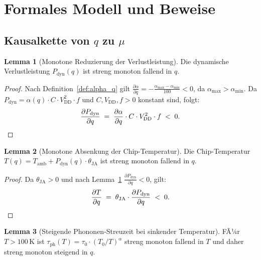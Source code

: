 ﻿\documentclass[a4paper,12pt]{article}
\theoremstyle{definition}
\newtheorem{lemma}{Lemma}
\begin{document}
\section{Formales Modell und Beweise}

\subsection{Kausalkette von $q$ zu $\mu$}

\begin{lemma}[Monotone Reduzierung der Verlustleistung]
\label{lem:verlust}
Die dynamische Verlustleistung $P_{\mathrm{dyn}}(q)$ ist streng monoton fallend in $q$.
\end{lemma}

\begin{proof}
Nach Definition~\ref{def:alpha_q} gilt
$\frac{\partial \alpha}{\partial q} = -\frac{\alpha_{\mathrm{max}} - \alpha_{\mathrm{min}}}{100} < 0$,
da $\alpha_{\mathrm{max}} > \alpha_{\mathrm{min}}$. Da $P_{\mathrm{dyn}} = \alpha(q) \cdot C \cdot V_{\mathrm{DD}}^2 \cdot f$
und $C, V_{\mathrm{DD}}, f > 0$ konstant sind, folgt:
\[
\frac{\partial P_{\mathrm{dyn}}}{\partial q} \;=\; \frac{\partial \alpha}{\partial q} \cdot C \cdot V_{\mathrm{DD}}^2 \cdot f \;<\; 0. \qedhere
\]
\end{proof}

\begin{lemma}[Monotone Absenkung der Chip-Temperatur]
\label{lem:temp}
Die Chip-Temperatur $T(q) = T_{\mathrm{amb}} + P_{\mathrm{dyn}}(q) \cdot \theta_{\mathrm{JA}}$
ist streng monoton fallend in $q$.
\end{lemma}

\begin{proof}
Da $\theta_{\mathrm{JA}} > 0$ und nach Lemma~\ref{lem:verlust}
$\frac{\partial P_{\mathrm{dyn}}}{\partial q} < 0$, gilt:
\[
\frac{\partial T}{\partial q} \;=\; \theta_{\mathrm{JA}} \cdot \frac{\partial P_{\mathrm{dyn}}}{\partial q} \;<\; 0. \qedhere
\]
\end{proof}

\begin{lemma}[Steigende Phononen-Streuzeit bei sinkender Temperatur]
\label{lem:tau}
FÃ¼r $T > 100\,\text{K}$ ist $\tau_{\mathrm{ph}}(T) = \tau_0 \cdot (T_0/T)^\alpha$ streng
monoton fallend in $T$ und daher streng monoton steigend in $q$.
\end{lemma}
\end{document}
